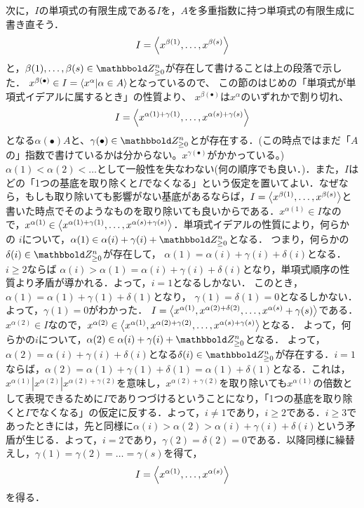 \documentclass[9pt]{ltjsarticle}
\begin{document}
\begin{myproof}
次に，$I$の単項式の有限生成である$I$を，$A$を多重指数に持つ単項式の有限生成に書き直そう．
\begin{align}
 I=\left\langle x^{\beta(1)},\dots,x^{\beta(s)} \right\rangle
\end{align}
と，$\beta(1),\dots,\beta(s)\in \Zge^n$が存在して書けることは上の段落で示した．
$x^{\beta(\bullet)} \in I = \left\langle x^\alpha | \alpha \in A \right\rangle$となっているので、
この節のはじめの「単項式が単項式イデアルに属するとき」の性質より、
$x^{\beta(\bullet)}$は$x^\alpha$のいずれかで割り切れ、
\begin{align}
 I=\left\langle x^{\alpha(1)+\gamma(1)},\dots,x^{\alpha(s)+\gamma(s)} \right\rangle
\end{align}
となる$\alpha(\bullet) A$と、$\gamma(\bullet )\in \Zge^n$とが存在する．(この時点ではまだ「$A$の」指数で書けているかは分からない。$x^{\gamma(\bullet)}$がかかっている。)$\alpha(1)< \alpha(2)< \dots$として一般性を失なわない(何の順序でも良い．)．また，$I$はどの「1つの基底を取り除くと$I$でなくなる」という仮定を置いてよい．なぜなら，もしも取り除いても影響がない基底があるならば，$I=\left\langle x^{\beta(1)},\dots,x^{\beta(s)} \right\rangle$と書いた時点でそのようなものを取り除いても良いからである．$x^{\alpha(1)}\in I$なので，$x^{\alpha(1)}\in \left\langle x^{\alpha(1)+\gamma(1)},\dots,x^{\alpha(s)+\gamma(s)} \right\rangle$．単項式イデアルの性質により，何らかの
$i$について，$\alpha(1) \in \alpha(i)+\gamma(i) + \Zge^n$となる．
 つまり，何らかの$\delta(i)\in \Zge^n$が存在して，
$\alpha(1)=\alpha(i)+\gamma(i)+\delta(i)$となる．$i\ge 2$ならば
$\alpha(i)>\alpha(1)=\alpha(i)+\gamma(i)+\delta(i)$となり，単項式順序の性質より矛盾が導かれる．よって，$i=1$となるしかない．
 このとき，$\alpha(1)=\alpha(1)+\gamma(1)+\delta(1)$となり，
$\gamma(1)=\delta(1)=0$となるしかない．よって，$\gamma(1)=0$がわかった．
$I=\left\langle x^{\alpha(1)},x^{\alpha(2)+\delta(2)},\dots,x^{\alpha(s)}+\gamma(s) \right\rangle$である．$x^{\alpha(2)}\in I$なので，$x^{\alpha(2)}\in \left\langle x^{\alpha(1)},x^{\alpha(2)+\gamma(2)},\dots,x^{\alpha(s)+\gamma(s)} \right\rangle$となる．
よって，何らかの$i$について，$\alpha(2)\in \alpha(i) + \gamma(i)+\Zge^n$となる．
よって，$\alpha(2)=\alpha(i)+\gamma(i)+\delta(i)$となる$\delta(i)\in \Zge^n$が存在する．$i=1$ならば，$\alpha(2)=\alpha(1)+\gamma(1)+\delta(1)=\alpha(1)+\delta(1)$となる．これは，$x^{\alpha(1)}|x^{\alpha(2)}|x^{\alpha(2)+\gamma(2)}$を意味し，$x^{\alpha(2)+\gamma(2)}$を取り除いても$x^{\alpha(1)}$の倍数として表現できるために$I$でありつづけるということになり，「1つの基底を取り除くと$I$でなくなる」の仮定に反する．よって，$i\neq 1$であり，$i\ge 2$である．$i\ge 3$であったときには，先と同様に$\alpha(i)>\alpha(2)>\alpha(i)+\gamma(i)+\delta(i)$という矛盾が生じる．よって，$i=2$であり，$\gamma(2)=\delta(2)=0$である．以降同様に繰替えし，$\gamma(1)=\gamma(2)=\dots = \gamma(s)$を得て，
\begin{align}
 I=\left\langle x^{\alpha(1)},\dots,x^{\alpha(s)} \right\rangle
\end{align}
を得る．
\end{myproof}
\end{document}
